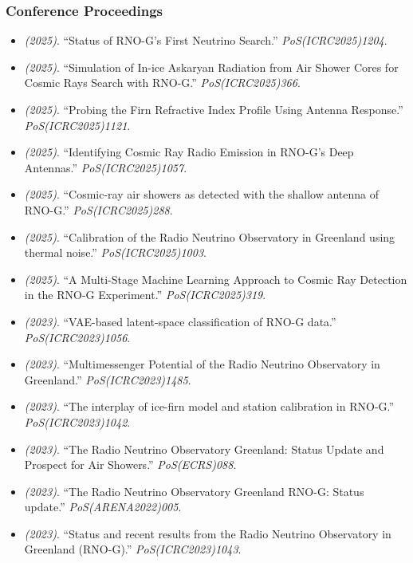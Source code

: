 \subsubsection{Conference Proceedings}
\begin{itemize}
\item \textit{(2025)}. ``Status of RNO-G's First Neutrino Search.'' \textit{PoS(ICRC2025)1204}. 
\item \textit{(2025)}. ``Simulation of In-ice Askaryan Radiation from Air Shower Cores for Cosmic Rays Search with RNO-G.'' \textit{PoS(ICRC2025)366}. 
\item \textit{(2025)}. ``Probing the Firn Refractive Index Profile Using Antenna Response.'' \textit{PoS(ICRC2025)1121}. 
\item \textit{(2025)}. ``Identifying Cosmic Ray Radio Emission in RNO-G's Deep Antennas.'' \textit{PoS(ICRC2025)1057}. 
\item \textit{(2025)}. ``Cosmic-ray air showers as detected with the shallow antenna of RNO-G.'' \textit{PoS(ICRC2025)288}. 
\item \textit{(2025)}. ``Calibration of the Radio Neutrino Observatory in Greenland using thermal noise.'' \textit{PoS(ICRC2025)1003}. 
\item \textit{(2025)}. ``A Multi-Stage Machine Learning Approach to Cosmic Ray Detection in the RNO-G Experiment.'' \textit{PoS(ICRC2025)319}. 
\item \textit{(2023)}. ``VAE-based latent-space classification of RNO-G data.'' \textit{PoS(ICRC2023)1056}.  
\item \textit{(2023)}. ``Multimessenger Potential of the Radio Neutrino Observatory in Greenland.'' \textit{PoS(ICRC2023)1485}.  
\item \textit{(2023)}. ``The interplay of ice-firn model and station calibration in RNO-G.'' \textit{PoS(ICRC2023)1042}. 
\item \textit{(2023)}. ``The Radio Neutrino Observatory Greenland: Status Update and Prospect for Air Showers.'' \textit{PoS(ECRS)088}. 
\item \textit{(2023)}. ``The Radio Neutrino Observatory Greenland RNO-G: Status update.'' \textit{PoS(ARENA2022)005}. 
\item \textit{(2023)}. ``Status and recent results from the Radio Neutrino Observatory in Greenland (RNO-G).'' \textit{PoS(ICRC2023)1043}. 

\end{itemize}
